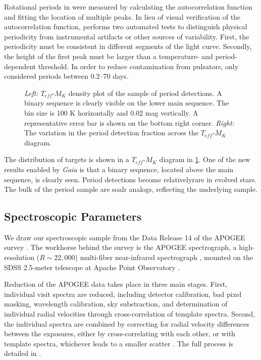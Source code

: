 \documentclass[manuscript]{aastex6}
\newcommand{\Gaia}{\mbox{\textit{Gaia}}}
\newcommand{\Teff}{\ensuremath{T_{eff}}}
\begin{document}
Rotational periods in \citet{McQuillan14} were measured by calculating the 
autocorrelation function and fitting the location of multiple peaks. In lieu 
of visual verification of the autocorrelation function, \citet{McQuillan14}
performs two automated tests to distinguish physical periodicity from
instrumental artifacts or other sources of variability. First, the 
periodicity must be consistent in different segments of the light curve.
Secondly, the height of the first peak must be larger than a temperature- and
period-dependent threshold. In order to reduce contamination from pulsators, 
\citet{McQuillan14} only considered periods between 0.2--70 days.

\begin{figure}[htb]
    \centering
    \caption{\emph{Left:} \Teff-\(M_K\) density plot of the sample of
        \citet{McQuillan14} period detections. A binary sequence is clearly 
        visible on the lower main sequence. The bin size is 100 K horizontally
        and 0.02 mag vertically. A representative error bar is shown
        on the bottom right corner. \emph{Right:} The variation in 
        the \citet{McQuillan14} period detection fraction across the 
        \Teff-\(M_K\) diagram.}\label{fig:mcquillan_selection}
\end{figure}

The distribution of \citet{McQuillan14} targets is shown in a \Teff-\(M_K\)
diagram in \cref{fig:mcquillan_selection}. One of the new results enabled by 
\Gaia{} is that a binary sequence,
located above the main sequence, is clearly seen. Period detections become
relativelyrare in evolved stars. The bulk of the period sample are soalr
analogs, reflecting the underlying sample.

\subsection{Spectroscopic Parameters}

We draw our spectroscopic sample from the Data Release 14 \citep{Abolfathi18}
of the APOGEE survey \citep{Majewski17}. The workhorse behind the survey is the
APOGEE spectrograph, a high-resolution (\(R \sim 22,000\)) multi-fiber
near-infrared spectrograph \citep{Wilson10}, mounted on the SDSS 2.5-meter
telescope at Apache Point Observatory \citep{Gunn06}.

Reduction of the APOGEE data takes place in three main stages. First,
individual visit spectra are reduced, including detector calibration, bad pixel
masking, wavelength calibration, sky substraction, and determination of
individual radial velocities through cross-correlation of template spectra.
Second, the individual spectra are combined by correcting for radial velocity
differences between the exposures, either by cross-correlating with each other,
or with template spectra, whichever leads to a smaller scatter
\citep{Holtzman18}. The full process is detailed in \citet{Nidever15}.
\end{document}
